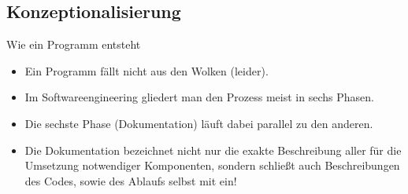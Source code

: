 \subsection{Konzeptionalisierung}
\begin{frame}{Wie ein Programm entsteht}
    \begin{itemize}[<+(1)->]
        \widei
        \item Ein Programm fällt nicht aus den Wolken (leider).
        \item Im Softwareengineering gliedert man den Prozess meist in sechs Phasen.
        \item Die sechste Phase (Dokumentation) läuft dabei parallel zu den anderen.
        \item Die Dokumentation bezeichnet nicht nur die exakte Beschreibung aller für die Umsetzung notwendiger Komponenten,\pause{} sondern schließt auch Beschreibungen des Codes,\pause{} sowie des Ablaufs selbst mit ein!
    \end{itemize}
\end{frame}

